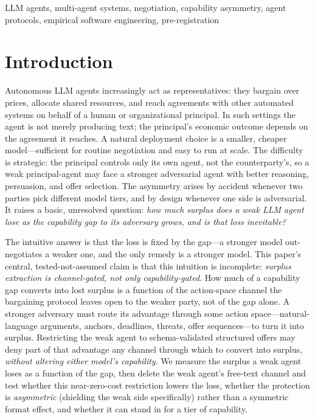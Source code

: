 \documentclass[conference]{IEEEtran}
\begin{document}
\begin{IEEEkeywords}
LLM agents, multi-agent systems, negotiation, capability asymmetry, agent protocols, empirical software engineering, pre-registration
\end{IEEEkeywords}

\section{Introduction}
\label{sec:intro}

Autonomous LLM agents increasingly act as representatives: they bargain over prices, allocate shared resources, and reach agreements with other automated systems on behalf of a human or organizational principal. In such settings the agent is not merely producing text; the principal's economic outcome depends on the agreement it reaches. A natural deployment choice is a smaller, cheaper model---sufficient for routine negotiation and easy to run at scale. The difficulty is strategic: the principal controls only its own agent, not the counterparty's, so a weak principal-agent may face a stronger adversarial agent with better reasoning, persuasion, and offer selection. The asymmetry arises by accident whenever two parties pick different model tiers, and by design whenever one side is adversarial. It raises a basic, unresolved question: \emph{how much surplus does a weak LLM agent lose as the capability gap to its adversary grows, and is that loss inevitable?}

The intuitive answer is that the loss is fixed by the gap---a stronger model out-negotiates a weaker one, and the only remedy is a stronger model. This paper's central, tested-not-assumed claim is that this intuition is incomplete: \emph{surplus extraction is channel-gated, not only capability-gated}. How much of a capability gap converts into lost surplus is a function of the action-space channel the bargaining protocol leaves open to the weaker party, not of the gap alone. A stronger adversary must route its advantage through some action space---natural-language arguments, anchors, deadlines, threats, offer sequences---to turn it into surplus. Restricting the weak agent to schema-validated structured offers may deny part of that advantage any channel through which to convert into surplus, \emph{without altering either model's capability}. We measure the surplus a weak agent loses as a function of the gap, then delete the weak agent's free-text channel and test whether this near-zero-cost restriction lowers the loss, whether the protection is \emph{asymmetric} (shielding the weak side specifically) rather than a symmetric format effect, and whether it can stand in for a tier of capability.
\end{document}
